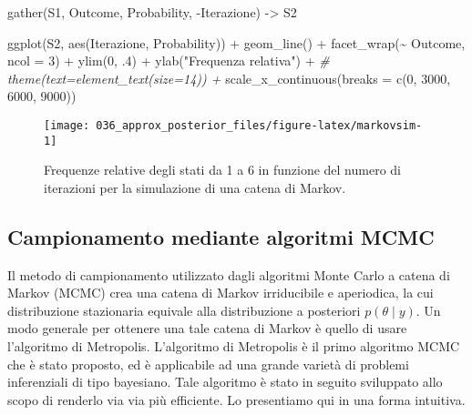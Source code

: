 \documentclass[
]{memoir}
\newenvironment{Shaded}{\begin{snugshade}}{\end{snugshade}}
\newcommand{\AttributeTok}[1]{\textcolor[rgb]{0.77,0.63,0.00}{#1}}
\newcommand{\CommentTok}[1]{\textcolor[rgb]{0.56,0.35,0.01}{\textit{#1}}}
\newcommand{\DecValTok}[1]{\textcolor[rgb]{0.00,0.00,0.81}{#1}}
\newcommand{\FunctionTok}[1]{\textcolor[rgb]{0.00,0.00,0.00}{#1}}
\newcommand{\NormalTok}[1]{#1}
\newcommand{\OtherTok}[1]{\textcolor[rgb]{0.56,0.35,0.01}{#1}}
\newcommand{\SpecialCharTok}[1]{\textcolor[rgb]{0.00,0.00,0.00}{#1}}
\newcommand{\StringTok}[1]{\textcolor[rgb]{0.31,0.60,0.02}{#1}}
\begin{document}
\begin{Shaded}
\begin{Highlighting}[]
\FunctionTok{gather}\NormalTok{(S1, Outcome, Probability, }\SpecialCharTok{{-}}\NormalTok{Iterazione) }\OtherTok{{-}\textgreater{}}\NormalTok{ S2}

\FunctionTok{ggplot}\NormalTok{(S2, }\FunctionTok{aes}\NormalTok{(Iterazione, Probability)) }\SpecialCharTok{+}
  \FunctionTok{geom\_line}\NormalTok{() }\SpecialCharTok{+}
  \FunctionTok{facet\_wrap}\NormalTok{(}\SpecialCharTok{\textasciitilde{}}\NormalTok{ Outcome, }\AttributeTok{ncol =} \DecValTok{3}\NormalTok{) }\SpecialCharTok{+}
  \FunctionTok{ylim}\NormalTok{(}\DecValTok{0}\NormalTok{, .}\DecValTok{4}\NormalTok{) }\SpecialCharTok{+}
  \FunctionTok{ylab}\NormalTok{(}\StringTok{"Frequenza relativa"}\NormalTok{) }\SpecialCharTok{+}
  \CommentTok{\# theme(text=element\_text(size=14))  +}
  \FunctionTok{scale\_x\_continuous}\NormalTok{(}\AttributeTok{breaks =} \FunctionTok{c}\NormalTok{(}\DecValTok{0}\NormalTok{, }\DecValTok{3000}\NormalTok{, }\DecValTok{6000}\NormalTok{, }\DecValTok{9000}\NormalTok{))}
\end{Highlighting}
\end{Shaded}

\begin{figure}

{\centering \texttt{[image: 036\_approx\_posterior\_files/figure-latex/markovsim-1]} 

}

\caption{Frequenze relative degli stati da 1 a 6 in funzione del numero di iterazioni per la simulazione di una catena di Markov.}\label{fig:markovsim}
\end{figure}

\hypertarget{campionamento-mediante-algoritmi-mcmc}{%
\subsection{Campionamento mediante algoritmi MCMC}\label{campionamento-mediante-algoritmi-mcmc}}

Il metodo di campionamento utilizzato dagli algoritmi Monte Carlo a catena di Markov (MCMC) crea una catena di Markov irriducibile e aperiodica, la cui distribuzione stazionaria equivale alla distribuzione a posteriori \(p(\theta \mid y)\). Un modo generale per ottenere una tale catena di Markov è quello di usare l'algoritmo di Metropolis. L'algoritmo di Metropolis è il primo algoritmo MCMC che è stato proposto, ed è applicabile ad una grande varietà di problemi inferenziali di tipo bayesiano. Tale algoritmo è stato in seguito sviluppato allo scopo di renderlo via via più efficiente. Lo presentiamo qui in una forma intuitiva.
\end{document}
